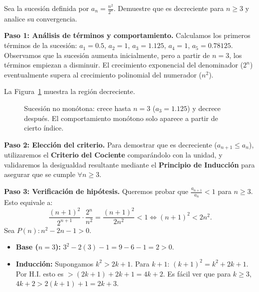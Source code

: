 \begin{example}
Sea la sucesión definida por $a_n = \frac{n^2}{2^n}$. Demuestre que es decreciente para $n \geq 3$ y analice su convergencia.

\begin{myproof}
\textbf{Paso 1: Análisis de términos y comportamiento.}
Calculamos los primeros términos de la sucesión:
$a_1 = 0.5$, $a_2 = 1$, $a_3 = 1.125$, $a_4 = 1$, $a_5 = 0.78125$.
Observamos que la sucesión aumenta inicialmente, pero a partir de $n=3$, los términos empiezan a disminuir. El crecimiento exponencial del denominador ($2^n$) eventualmente supera al crecimiento polinomial del numerador ($n^2$).

La Figura~\ref{fig:sucesion_no_monotona} muestra la región decreciente.

\begin{figure}[H]
\centering
\caption{Sucesión no monótona: crece hasta $n=3$ ($a_3=1.125$) y decrece después. El comportamiento monótono solo aparece a partir de cierto índice.}
\label{fig:sucesion_no_monotona}
\end{figure}

\textbf{Paso 2: Elección del criterio.}
Para demostrar que es decreciente ($a_{n+1} \leq a_n$), utilizaremos el \textbf{Criterio del Cociente} comparándolo con la unidad, y validaremos la desigualdad resultante mediante el \textbf{Principio de Inducción} para asegurar que se cumple $\forall n \geq 3$.

\textbf{Paso 3: Verificación de hipótesis.}
Queremos probar que $\frac{a_{n+1}}{a_n} < 1$ para $n \geq 3$. Esto equivale a:
\[
\frac{(n+1)^2}{2^{n+1}} \cdot \frac{2^n}{n^2} = \frac{(n+1)^2}{2n^2} < 1 \iff (n+1)^2 < 2n^2.
\]
Sea $P(n): n^2 - 2n - 1 > 0$.
\begin{itemize}
    \item \textbf{Base ($n=3$):} $3^2 - 2(3) - 1 = 9 - 6 - 1 = 2 > 0$. \checkmark
    \item \textbf{Inducción:} Supongamos $k^2 > 2k + 1$. Para $k+1$: $(k+1)^2 = k^2 + 2k + 1$. Por H.I. esto es $> (2k+1) + 2k + 1 = 4k + 2$. Es fácil ver que para $k \geq 3$, $4k + 2 > 2(k+1) + 1 = 2k + 3$.
\end{itemize}


\end{myproof}
\end{example}
